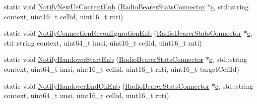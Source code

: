\begin{DoxyCompactItemize}
\item 
static void \hyperlink{classns3_1_1RadioBearerStatsConnector_a78cb88c11eff737f35c1ea9cd42d75a2}{Notify\+New\+Ue\+Context\+Enb} (\hyperlink{classns3_1_1RadioBearerStatsConnector}{Radio\+Bearer\+Stats\+Connector} $\ast$\hyperlink{mmwave_2model_2fading-traces_2fading__trace__generator_8m_ae0323a9039add2978bf5b49550572c7c}{c}, std\+::string context, uint16\+\_\+t cellid, uint16\+\_\+t rnti)
\item 
static void \hyperlink{classns3_1_1RadioBearerStatsConnector_ae0909fe24d58f9ca9c00bd9718a2d49c}{Notify\+Connection\+Reconfiguration\+Enb} (\hyperlink{classns3_1_1RadioBearerStatsConnector}{Radio\+Bearer\+Stats\+Connector} $\ast$\hyperlink{mmwave_2model_2fading-traces_2fading__trace__generator_8m_ae0323a9039add2978bf5b49550572c7c}{c}, std\+::string context, uint64\+\_\+t imsi, uint16\+\_\+t cellid, uint16\+\_\+t rnti)
\item 
static void \hyperlink{classns3_1_1RadioBearerStatsConnector_af6881db8b551a57c2d69f93ed44c3aa7}{Notify\+Handover\+Start\+Enb} (\hyperlink{classns3_1_1RadioBearerStatsConnector}{Radio\+Bearer\+Stats\+Connector} $\ast$\hyperlink{mmwave_2model_2fading-traces_2fading__trace__generator_8m_ae0323a9039add2978bf5b49550572c7c}{c}, std\+::string context, uint64\+\_\+t imsi, uint16\+\_\+t cellid, uint16\+\_\+t rnti, uint16\+\_\+t target\+Cell\+Id)
\item 
static void \hyperlink{classns3_1_1RadioBearerStatsConnector_a64e263f8e1571b8136daeb4e770e7b0b}{Notify\+Handover\+End\+Ok\+Enb} (\hyperlink{classns3_1_1RadioBearerStatsConnector}{Radio\+Bearer\+Stats\+Connector} $\ast$\hyperlink{mmwave_2model_2fading-traces_2fading__trace__generator_8m_ae0323a9039add2978bf5b49550572c7c}{c}, std\+::string context, uint64\+\_\+t imsi, uint16\+\_\+t cellid, uint16\+\_\+t rnti)
\end{DoxyCompactItemize}
